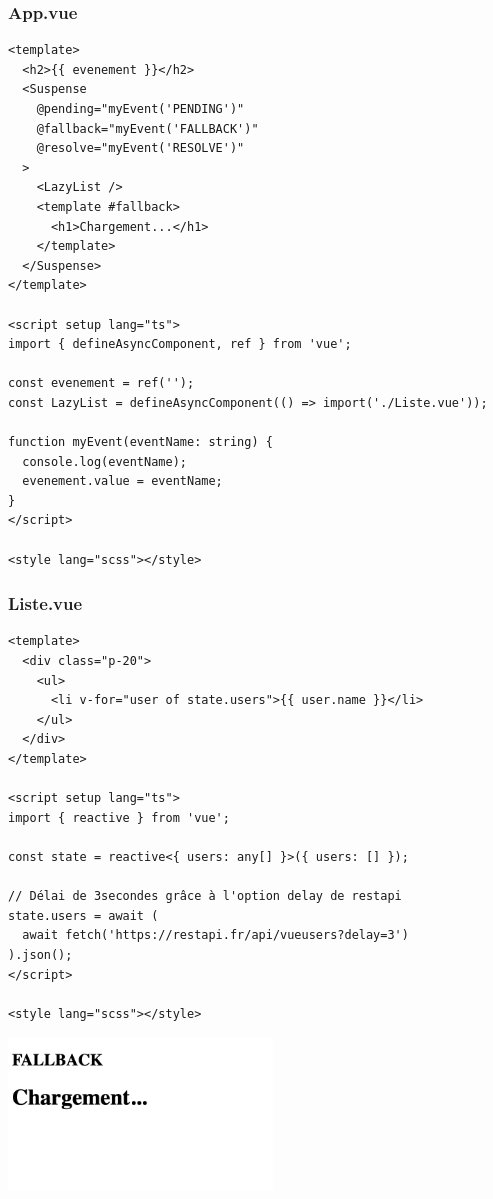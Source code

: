 \subsubsection*{App.vue}
\begin{verbatim}
<template>
  <h2>{{ evenement }}</h2>
  <Suspense
    @pending="myEvent('PENDING')"
    @fallback="myEvent('FALLBACK')"
    @resolve="myEvent('RESOLVE')"
  >
    <LazyList />
    <template #fallback>
      <h1>Chargement...</h1>
    </template>
  </Suspense>
</template>

<script setup lang="ts">
import { defineAsyncComponent, ref } from 'vue';

const evenement = ref('');
const LazyList = defineAsyncComponent(() => import('./Liste.vue'));

function myEvent(eventName: string) {
  console.log(eventName);
  evenement.value = eventName;
}
</script>

<style lang="scss"></style>
\end{verbatim}
\subsubsection*{Liste.vue}
\begin{verbatim}
<template>
  <div class="p-20">
    <ul>
      <li v-for="user of state.users">{{ user.name }}</li>
    </ul>
  </div>
</template>

<script setup lang="ts">
import { reactive } from 'vue';

const state = reactive<{ users: any[] }>({ users: [] });

// Délai de 3secondes grâce à l'option delay de restapi
state.users = await (
  await fetch('https://restapi.fr/api/vueusers?delay=3')
).json();
</script>

<style lang="scss"></style>
\end{verbatim}
\begin{center}
\includegraphics[width=7cm]{images/image32.png}
\end{center}
